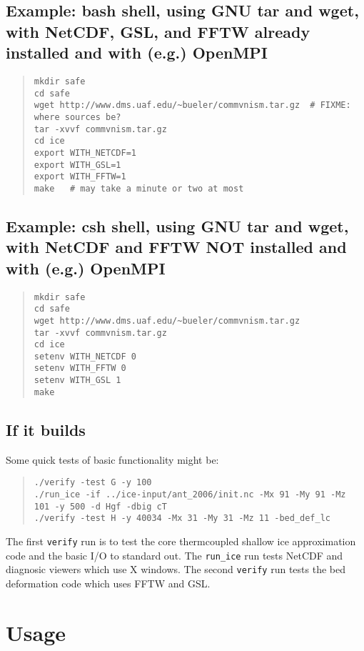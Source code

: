 \documentclass[11pt,final]{amsart}
\renewcommand{\t}[1]{\texttt{#1}}
\begin{document}
\subsection{Example: bash shell, using GNU tar and wget, with NetCDF, GSL, and FFTW already installed and with (e.g.) OpenMPI}

\begin{quote}\begin{verbatim}
mkdir safe
cd safe
wget http://www.dms.uaf.edu/~bueler/commvnism.tar.gz  # FIXME: where sources be?
tar -xvvf commvnism.tar.gz
cd ice
export WITH_NETCDF=1
export WITH_GSL=1
export WITH_FFTW=1
make   # may take a minute or two at most
\end{verbatim}
\end{quote}

\subsection{Example: csh shell, using GNU tar and wget, with NetCDF and FFTW NOT installed and with (e.g.) OpenMPI}

\begin{quote}\begin{verbatim}
mkdir safe
cd safe
wget http://www.dms.uaf.edu/~bueler/commvnism.tar.gz
tar -xvvf commvnism.tar.gz
cd ice
setenv WITH_NETCDF 0
setenv WITH_FFTW 0
setenv WITH_GSL 1
make
\end{verbatim}
\end{quote}

\subsection{If it builds} Some quick tests of basic functionality might be:
\begin{quote}\begin{verbatim}
./verify -test G -y 100
./run_ice -if ../ice-input/ant_2006/init.nc -Mx 91 -My 91 -Mz 101 -y 500 -d Hgf -dbig cT
./verify -test H -y 40034 -Mx 31 -My 31 -Mz 11 -bed_def_lc
\end{verbatim}
\end{quote}
The first \t{verify} run is to test the core thermcoupled shallow ice approximation code and the basic I/O to standard out.  The \verb|run_ice| run tests NetCDF and diagnosic viewers which use X windows.  The second \t{verify} run tests the bed deformation code which uses FFTW and GSL.


\section{Usage}
\end{document}
